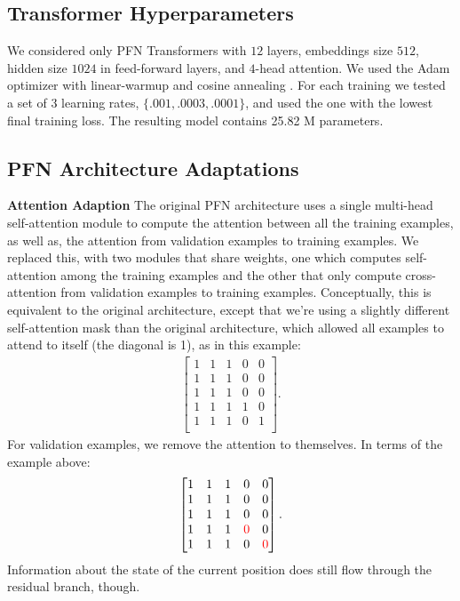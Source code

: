 \documentclass{article}
\begin{document}
\subsection{Transformer Hyperparameters}\label{app:transformer_hypers}
We considered only PFN Transformers with $12$ layers, embeddings size $512$, hidden size $1024$ in feed-forward layers, and $4$-head attention. We used the Adam optimizer \citep{kingma-iclr15a} with linear-warmup and cosine annealing \citep{loshchilov-iclr17a}. For each training we tested a set of 3 learning rates, $\{.001,.0003,.0001\}$, and used the one with the lowest final training loss. The resulting model contains  25.82 M parameters.

\subsection{PFN Architecture Adaptations}
\label{app:pfn architecture change}
\textbf{Attention Adaption}
The original PFN architecture \citep{muller-iclr22a} uses a single multi-head self-attention module \citep{vaswani-neurips17a} to compute the attention between all the training examples, as well as, the attention from validation examples to training examples.
We replaced this, with two modules that share weights, one which computes self-attention among the training examples and the other that only compute cross-attention from validation examples to training examples.
Conceptually, this is equivalent to the original architecture, except that we're using a slightly different self-attention mask than the original architecture, which allowed all examples to attend to itself (the diagonal is 1), as in this example:
\begin{align}
\begin{bmatrix}
1& 1& 1& 0& 0\\
1& 1& 1& 0& 0\\
1& 1& 1& 0& 0\\
1& 1& 1& 1& 0\\
1& 1& 1& 0& 1\\
\end{bmatrix}.
\end{align}
For validation examples, we remove the attention to themselves. In terms of the example above:
\begin{align}
\begin{bmatrix}
1& 1& 1& 0& 0\\
1& 1& 1& 0& 0\\
1& 1& 1& 0& 0\\
1& 1& 1& \textcolor{red}{0}& 0\\
1& 1& 1& 0& \textcolor{red}{0}\\
\end{bmatrix}.
\end{align}
Information about the state of the current position does still flow through the residual branch, though.
\end{document}
